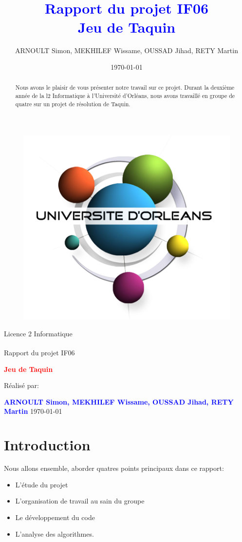 ﻿\documentclass[a4paper,twoside,12pt]{report}
\title{\textcolor{blue}{\Large Rapport du projet IF06}\\\textcolor{blue}{\Large 
Jeu de Taquin}}
\author{ARNOULT Simon, MEKHILEF Wissame, OUSSAD Jihad, RETY Martin 
\date{\today}}
\begin{document}
%
\begin{figure}[H]
\includegraphics[width=0.2\linewidth]{Logo-univ-orleans.png}

\end{figure}
\vspace{2cm}
%
\begin{center}
{\Huge Licence 2 Informatique\\\ \\Rapport du projet IF06}
\par\vspace{1.4cm}

{\Huge\bf \textcolor{red}{\bf Jeu de Taquin}}
\par\vspace{1.6cm}

{\Large       Réalisé par:}
\par\vspace{1.3cm}
{\large\bf \textcolor{blue}{ARNOULT Simon, MEKHILEF Wissame, OUSSAD Jihad, RETY 
Martin}}
\vfill
\today
\end{center}
\pagestyle{fancy}

\begin{abstract}
%
Nous avons le plaisir de vous présenter notre travail sur ce projet. Durant la 
deuxième année de la l2 Informatique
à l'Université d'Orléans, nous avons travaillé en groupe de quatre sur un projet 
de résolution de Taquin.
\end{abstract}
 
\newpage
\tableofcontents
\listoffigures
\newpage

\chapter{Introduction}
Nous allons ensemble, aborder quatres points principaux dans ce rapport:
\begin{itemize}
\item L'étude du projet
\item L'organisation de travail au sain du groupe
\item Le développement du code
\item L'analyse des algorithmes.
\end{itemize}
%
\end{document}
